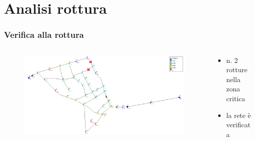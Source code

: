 \documentclass{beamer}
\begin{document}
\section{Analisi rottura}
\begin{frame}
	\frametitle{Verifica alla rottura}
	\begin{columns}
		\begin{column}{.7\textwidth}
				\begin{figure}
					\centering
					\includegraphics[width=\linewidth]{images/pressure_rottura}
				\end{figure}
		\end{column}
%
		\begin{column}{.3\textwidth}
			\begin{itemize}
				\item n. 2 rotture nella zona critica
				\item la rete è verificata
			\end{itemize}
		\end{column}
	\end{columns}
\end{frame}
%
%
%
\end{document}
